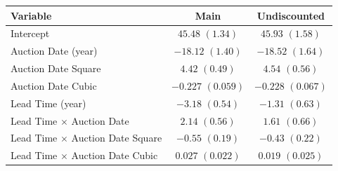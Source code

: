 
\begin{tabular}[t]{lcc}
\toprule
Variable & Main & Undiscounted\\
\midrule
Intercept & $45.48$ $(1.34)$ & $45.93$ $(1.58)$\\
Auction Date (year) & $-18.12$ $(1.40)$ & $-18.52$ $(1.64)$\\
Auction Date Square & $4.42$ $(0.49)$ & $4.54$ $(0.56)$\\
Auction Date Cubic & $-0.227$ $(0.059)$ & $-0.228$ $(0.067)$\\
Lead Time (year) & $-3.18$ $(0.54)$ & $-1.31$ $(0.63)$\\
Lead Time $\times$ Auction Date & $2.14$ $(0.56)$ & $1.61$ $(0.66)$\\
Lead Time $\times$ Auction Date Square & $-0.55$ $(0.19)$ & $-0.43$ $(0.22)$\\
Lead Time $\times$ Auction Date Cubic & $0.027$ $(0.022)$ & $0.019$ $(0.025)$\\
\bottomrule
\end{tabular}
